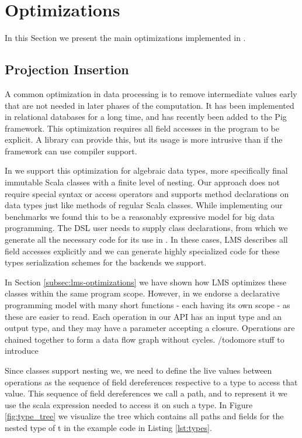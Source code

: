 \section{Optimizations}
\label{sec:optimizations}
In this Section we present the main optimizations implemented in \tool.
\subsection{Projection Insertion}
\label{sec:field-reduction}

A common optimization in data processing is to remove intermediate values early that are not needed in later phases of the computation. It has been implemented in relational databases for a long time, and has recently been added to the Pig framework. This optimization requires all field accesses in the program to be explicit. A library can provide this, but its usage is more intrusive than if the framework can use compiler support. 

In \tool we support this optimization for algebraic data types, more specifically final immutable Scala classes with a finite level of nesting. Our approach does not require special syntax or access operators and supports method declarations on data types just like methods of regular Scala classes. While implementing our benchmarks we found this to be a reasonably expressive model for big data programming. The DSL user needs to supply class declarations, from which we generate all the necessary code for its use in \tool. In these cases, LMS describes all field accesses explicitly and we can generate highly specialized code for these types serialization schemes for the backends we support.


In Section \ref{subsec:lms-optimizations} we have shown how LMS optimizes these classes within the same program scope. However, in \tool we endorse a declarative programming model with many short functions - each having its own scope - as these are easier to read. Each operation in our API has an input type and an output type, and they may have a parameter accepting a closure. Operations are chained together to form a data flow graph without cycles. /todo{more stuff to introduce}


Since classes support nesting we, we need to define the live values between operations as the sequence of field dereferences respective to a type to access that value. This sequence of field dereferences we call a path, and to represent it we use the scala expression needed to access it on such a type. In Figure \ref{fig:type_tree} we visualize the tree which contains all paths and fields for the nested type of t in the example code in Listing \ref{lst:types}.

